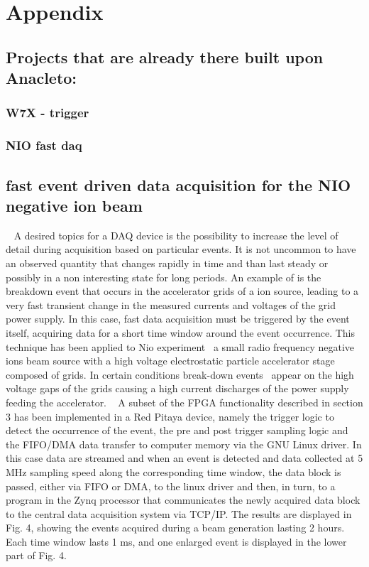 \chapter{Appendix}
\section{Projects that are already there built upon Anacleto:}
\subsection{W7X - trigger }
\subsection{NIO fast daq}
\section{fast event driven data acquisition for the NIO negative ion beam}
~
A desired topics for a DAQ device is the possibility to increase the level of detail during acquisition based on particular events. It is not uncommon to have an observed quantity that changes rapidly in time and than last steady or possibly in a non interesting state for long periods. An example of is the breakdown event that occurs in the accelerator grids of a ion source, leading to a very fast transient change in the measured currents and voltages of the grid power supply. In this case, fast data acquisition must be triggered by the event itself, acquiring data for a short time window around the event occurrence. This technique has been applied to Nio experiment~\cite{DEMURI2015249} a small radio frequency negative ions beam source with a high voltage electrostatic particle accelerator stage composed of grids. In certain conditions break-down events~\cite{RECCHIA20111545} appear on the high voltage gaps of the grids causing a  high current discharges of the power supply feeding the accelerator. 
~
A subset of the FPGA functionality described in section 3 has been implemented in a Red Pitaya device, namely the trigger logic to detect the occurrence of the event, the pre and post trigger sampling logic and the FIFO/DMA data transfer to computer memory via the GNU Linux driver. In this case data are streamed and when an event is detected and data collected at 5 MHz sampling speed along the corresponding time window, the data block is passed, either via FIFO or DMA, to the linux driver and then, in turn, to a program in the Zynq processor that communicates the newly acquired data block to the central data acquisition system via TCP/IP. The results are displayed in Fig. 4, showing the events acquired during a beam generation lasting 2 hours. Each time window lasts 1 ms, and one enlarged event is  displayed in the lower part of Fig. 4.    
